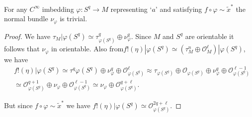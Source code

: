 \begin{lemma}\label{chap1:lem5.6}%
For any $C^\infty$ imbedding $\varphi: S^q \to M$ representing `$a$'
and satisfying $f \circ \varphi \sim \tilde{x}^*$ the normal bundle
$\nu_\varphi$ is trivial. 
\end{lemma}

\begin{proof}
We have $ \tau_M | \varphi (S^q) \simeq \tau^q_{\varphi (S^q)} \oplus
\nu^q_\varphi$. Since $M$ and $S^q$ are orientable it follows that
$\nu_\varphi $ in orientable. Also from\pageoriginale $f! (\eta)|
\varphi (S^q) 
\simeq (\tau^n_M \oplus \mathscr{O}^\ell_M)| \varphi (S^q)$, we have
\begin{align*}
& f! (\eta)| \varphi (S^q) \simeq \tau^q \varphi (S^q) \oplus
\nu^q_\varphi \oplus \mathscr{O}^\ell_{\varphi (S^q)} \approx
\tau_{\varphi (S^q)} \oplus \mathscr{O}_{\varphi (S^q)} \oplus \nu^q_\varphi
\oplus \mathscr{O}^{\ell-1}_{\varphi (S^q)}\\
& \simeq
\mathscr{O}^{q+1}_{\varphi (S^q)} \oplus \nu_\varphi \oplus
\mathscr{O}^{\ell-1}_{\varphi (S^q)} \simeq \nu_\varphi \oplus
\mathscr{O}^{q + \ell}_{\varphi (S^q)}. 
\end{align*}

But since $f \circ \varphi \sim \tilde{x}^*$ we have $f ! (\eta)| \varphi
(S^q) \simeq \mathscr{O}^{2q + \ell}_{\varphi (S^q)}$. 


\end{proof}
